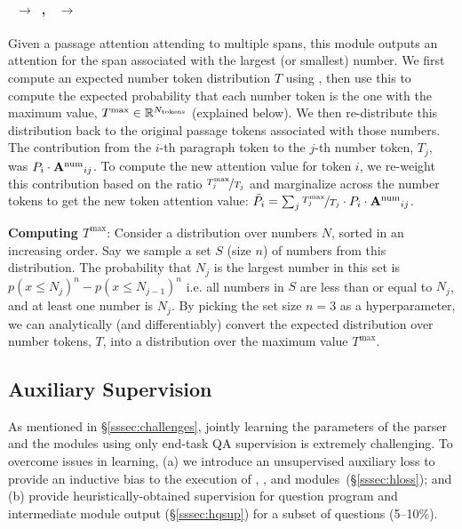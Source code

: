 \documentclass[main.tex]{subfiles}
\begin{document}
\paragraph{~$\rightarrow$~\typePara, ~$\rightarrow$~\typePara}\mbox{}%
\noindent
Given a passage attention attending to multiple spans, this module outputs an attention for the span associated with the largest (or smallest) number. We first compute an expected number token distribution $T$ using , then use this to compute the expected probability that each number token is the one with the maximum value, $T^{\text{max}} \in \mathbb{R}^{N_{\text{tokens}}}$ (explained below). We then re-distribute this distribution back to the original passage tokens associated with those numbers.
%
The contribution from the $i$-th paragraph token to the $j$-th number token, $T_{j}$, was $P_{i}\cdot \mathbf{A^{\text{num}}}_{ij}$.
To compute the new attention value for token $i$, we re-weight this contribution based on the ratio $\nicefrac{T^{\text{max}}_{j}}{T_{j}}$ and marginalize across the number tokens to get the new token attention value: $\bar{P}_{i} = \sum_{j} \nicefrac{T^{\text{max}}_{j}}{T_{j}} \cdot P_{i}\cdot \mathbf{A^{\text{num}}}_{ij}$.

\textbf{Computing $T^{\text{max}}$}:
Consider a distribution over numbers $N$, sorted in an increasing order.
Say we sample a set $S$ (size $n$) of numbers from this distribution. The probability that $N_{j}$ is the largest number in this set is $p(x \leq N_{j})^{n} - p(x \leq N_{j - 1})^{n}$
i.e. all numbers in $S$ are less than or equal to $N_{j}$, and at least one number is $N_{j}$.  By picking the set size $n=3$ as a hyperparameter, we can analytically (and differentiably) convert the expected distribution over number tokens, $T$, into a distribution over the maximum value $T^{\text{max}}$.



\subsection{Auxiliary Supervision}
\label{ssec:heuristicsupervision}
As mentioned in \S\ref{sssec:challenges}, jointly learning the parameters of the parser and the modules using only end-task QA supervision is extremely challenging.
To overcome issues in learning,
(a) we introduce an unsupervised auxiliary loss to provide an inductive bias to the execution of , , and  modules~(\S\ref{sssec:hloss});
and (b) provide heuristically-obtained supervision for question program and intermediate module output (\S\ref{sssec:hqsup}) for a subset of questions (5--10\%).
\end{document}
